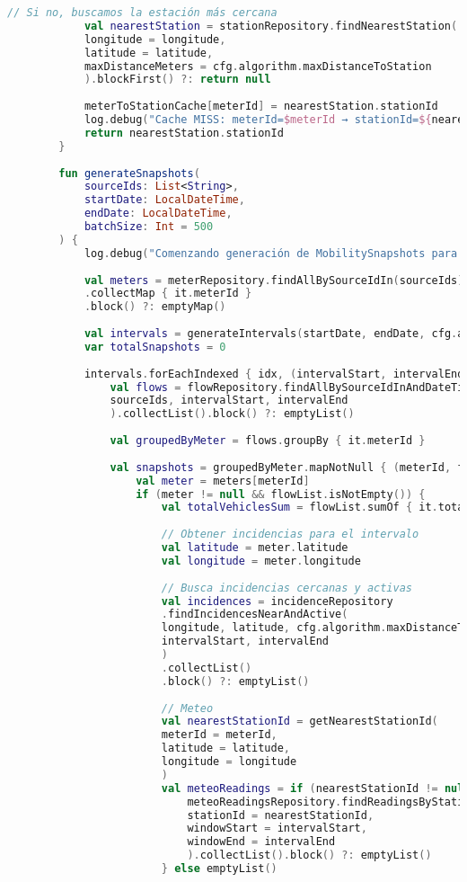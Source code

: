 \begin{lstlisting}[language=Kotlin, caption={Clase MobilitySnapshotGeneratorService}]
			// Si no, buscamos la estación más cercana
			val nearestStation = stationRepository.findNearestStation(
			longitude = longitude,
			latitude = latitude,
			maxDistanceMeters = cfg.algorithm.maxDistanceToStation
			).blockFirst() ?: return null
			
			meterToStationCache[meterId] = nearestStation.stationId
			log.debug("Cache MISS: meterId=$meterId → stationId=${nearestStation.stationId}")
			return nearestStation.stationId
		}
		
		fun generateSnapshots(
			sourceIds: List<String>,
			startDate: LocalDateTime,
			endDate: LocalDateTime,
			batchSize: Int = 500
		) {
			log.debug("Comenzando generación de MobilitySnapshots para sourceIds=${sourceIds.joinToString(",")}, fechas entre '${DateTimeUtils.format(startDate)}' y '${DateTimeUtils.format(endDate)}'")
			
			val meters = meterRepository.findAllBySourceIdIn(sourceIds)
			.collectMap { it.meterId }
			.block() ?: emptyMap()
			
			val intervals = generateIntervals(startDate, endDate, cfg.algorithm.timeWindowDuration)
			var totalSnapshots = 0
			
			intervals.forEachIndexed { idx, (intervalStart, intervalEnd) ->
				val flows = flowRepository.findAllBySourceIdInAndDateTimeBetweenQuery(
				sourceIds, intervalStart, intervalEnd
				).collectList().block() ?: emptyList()
				
				val groupedByMeter = flows.groupBy { it.meterId }
				
				val snapshots = groupedByMeter.mapNotNull { (meterId, flowList) ->
					val meter = meters[meterId]
					if (meter != null && flowList.isNotEmpty()) {
						val totalVehiclesSum = flowList.sumOf { it.totalVehicles.toIntOrNull() ?: 0 }
						
						// Obtener incidencias para el intervalo
						val latitude = meter.latitude
						val longitude = meter.longitude
						
						// Busca incidencias cercanas y activas
						val incidences = incidenceRepository
						.findIncidencesNearAndActive(
						longitude, latitude, cfg.algorithm.maxDistanceToIncidences,
						intervalStart, intervalEnd
						)
						.collectList()
						.block() ?: emptyList()
						
						// Meteo
						val nearestStationId = getNearestStationId(
						meterId = meterId,
						latitude = latitude,
						longitude = longitude
						)
						val meteoReadings = if (nearestStationId != null) {
							meteoReadingsRepository.findReadingsByStationIdAndDateTimeBetween(
							stationId = nearestStationId,
							windowStart = intervalStart,
							windowEnd = intervalEnd
							).collectList().block() ?: emptyList()
						} else emptyList()
						

\end{lstlisting}

